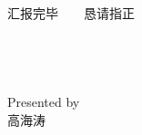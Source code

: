 \documentclass{ctexbeamer}
\begin{document}
\begin{frame}
    \begin{center}
        汇报完毕~~~~恳请指正
        ~\\
        ~\\
        ~\\
        ~\\
        ~\\
        Presented by
        ~\\
        高海涛
    \end{center}
\end{frame}
\end{document}
